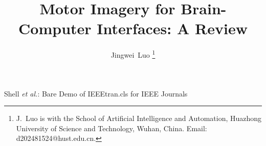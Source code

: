 \documentclass[journal,twocolumn]{IEEEtran}
\begin{document}
\title{Motor Imagery for Brain-Computer Interfaces: A Review}

\author{Jingwei~Luo
\thanks{J.~Luo is with the School of Artificial Intelligence and Automation, Huazhong University of Science and Technology, Wuhan, China. Email: d202481524@hust.edu.cn.}}


%
{Shell \MakeLowercase{\textit{et al.}}: Bare Demo of IEEEtran.cls for IEEE Journals}
\maketitle

\begin{abstract}

\end{abstract}
\end{document}
